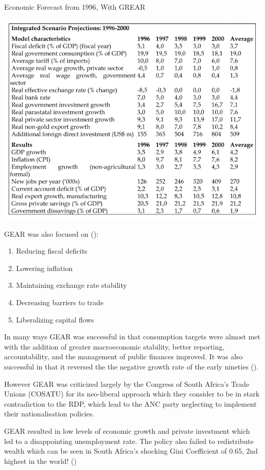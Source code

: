 \documentclass{elsarticle}
\begin{document}
\begin{table}[H]
  \centering
  \caption{Economic Forecast from 1996, With GREAR}
  \includegraphics[width=1\textwidth]{images/Gear.png}
  \cite{GEAR1996}
\end{table}

GEAR was also focused on (\cite{SAHO2014}): 
\begin{enumerate}
    \item Reducing fiscal deficits
    \item Lowering inflation
    \item Maintaining exchange rate stability
    \item Decreasing barriers to trade
    \item Liberalizing capital flows
\end{enumerate}

In many ways GEAR was successful in that consumption targets were almost met with the addition of greater macroeconomic stability, better reporting, accountability, and the management of public finances improved. It was also successful in that it reversed the the negative growth rate of the early nineties (\cite{SAHO2014}).

However GEAR was criticized largely by the Congress of South Africa's Trade Unions (COSATU) for its neo-liberal approach which they consider to be in stark contradiction to the RDP, which lead to the ANC party neglecting to implement their nationalisation policies.

GEAR resulted in low levels of economic growth and private investment which led to a disappointing unemployment rate. The policy also failed to redistribute wealth which can be seen in South Africa’s shocking Gini Coefficient of 0.65, 2nd highest in the world! (\cite{WorldBank2014})
\end{document}
